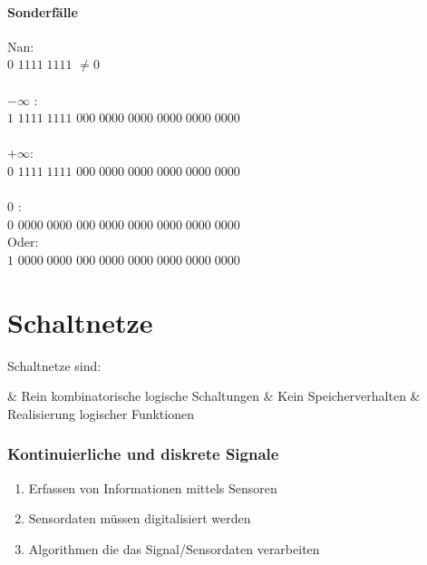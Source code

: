 \documentclass[a4paper]{scrartcl}
\begin{document}
	\paragraph{Sonderfälle}
			Nan:\\
			\colorbox{green!30}{$0$} \colorbox{blue!30}{$1111\;1111$} \colorbox{red!30}{$ \neq 0 $}\\
			\\
			\(- \infty\) :\\
			\colorbox{green!30}{$1$} \colorbox{blue!30}{$1111\;1111$} \colorbox{red!30}{$000\; 0000\; 0000\; 0000\; 0000\; 0000$}\\
			\\
			\(+ \infty\):\\
			\colorbox{green!30}{$0$} \colorbox{blue!30}{$1111\;1111$} \colorbox{red!30}{$000\; 0000\; 0000\; 0000\; 0000\; 0000$}\\
			\\
			0 :\\
			\colorbox{green!30}{$0$} \colorbox{blue!30}{$0000\;0000$} \colorbox{red!30}{$000\; 0000\; 0000\; 0000\; 0000\; 0000$}\\
			Oder:\\
			\colorbox{green!30}{$1$} \colorbox{blue!30}{$0000\;0000$} \colorbox{red!30}{$000\; 0000\; 0000\; 0000\; 0000\; 0000$}\\

							

	\section{Schaltnetze}
		
			Schaltnetze sind:
			\begin{easylist}
				& Rein kombinatorische logische Schaltungen
				& Kein Speicherverhalten
				& Realisierung logischer Funktionen
			\end{easylist}
		
			\subsubsection{Kontinuierliche und diskrete Signale}
				\begin{enumerate}
					\item Erfassen von Informationen mittels Sensoren
					\item Sensordaten müssen digitalisiert werden
					\item Algorithmen die das Signal/Sensordaten verarbeiten
				\end{enumerate}
			
\end{document}
